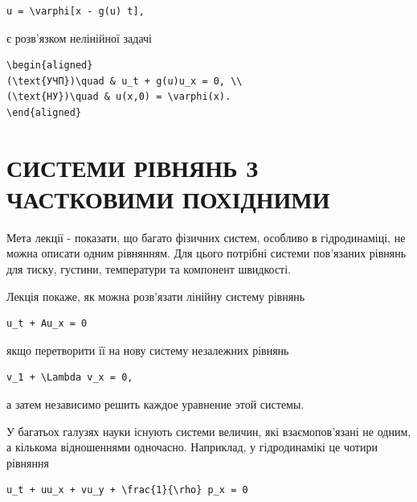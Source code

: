 \documentclass[
  ukrainian,
]{article}
\begin{document}
\begin{verbatim}
u = \varphi[x - g(u) t],
\end{verbatim}

є розв'язком нелінійної задачі

\begin{verbatim}
\begin{aligned}
(\text{УЧП})\quad & u_t + g(u)u_x = 0, \\
(\text{НУ})\quad & u(x,0) = \varphi(x).
\end{aligned}
\end{verbatim}

\section{СИСТЕМИ РІВНЯНЬ З ЧАСТКОВИМИ
ПОХІДНИМИ}\label{ux441ux438ux441ux442ux435ux43cux438-ux440ux456ux432ux43dux44fux43dux44c-ux437-ux447ux430ux441ux442ux43aux43eux432ux438ux43cux438-ux43fux43eux445ux456ux434ux43dux438ux43cux438}

Мета лекції - показати, що багато фізичних систем, особливо в
гідродинаміці, не можна описати одним рівнянням. Для цього потрібні
системи пов'язаних рівнянь для тиску, густини, температури та компонент
швидкості.

Лекція покаже, як можна розв'язати лінійну систему рівнянь

\begin{verbatim}
u_t + Au_x = 0
\end{verbatim}

якщо перетворити її на нову систему незалежних рівнянь

\begin{verbatim}
v_1 + \Lambda v_x = 0,
\end{verbatim}

а затем независимо решить каждое уравнение этой системы.

У багатьох галузях науки існують системи величин, які взаємопов'язані не
одним, а кількома відношеннями одночасно. Наприклад, у гідродинамікі це
чотири рівняння

\begin{verbatim}
u_t + uu_x + vu_y + \frac{1}{\rho} p_x = 0
\end{verbatim}
\end{document}
